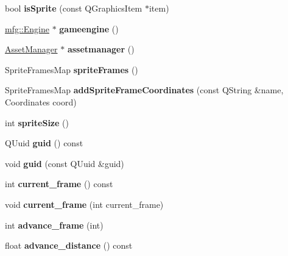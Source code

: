 \begin{DoxyCompactItemize}
bool {\bfseries is\+Sprite} (const Q\+Graphics\+Item $\ast$item)
\item 
\mbox{\label{class_sprite_a289c85c632dfcafe8cc378c649d8375c}} 
\hyperlink{classmfg_1_1_engine}{mfg\+::\+Engine} $\ast$ {\bfseries gameengine} ()
\item 
\mbox{\label{class_sprite_abe1915f40313eaca777665dc041440ab}} 
\hyperlink{class_asset_manager}{Asset\+Manager} $\ast$ {\bfseries assetmanager} ()
\item 
\mbox{\label{class_sprite_ad690815ac85d948a52a1136596037c67}} 
Sprite\+Frames\+Map {\bfseries sprite\+Frames} ()
\item 
\mbox{\label{class_sprite_a2c6faefb1b08c2a87d6b0562f3577e6f}} 
Sprite\+Frames\+Map {\bfseries add\+Sprite\+Frame\+Coordinates} (const Q\+String \&name, Coordinates coord)
\item 
\mbox{\label{class_sprite_a6dccaa6d6fca24fc01a7a48542bc3fa2}} 
int {\bfseries sprite\+Size} ()
\item 
\mbox{\label{class_sprite_a2891012b8636c18d38b244bc54d31c03}} 
Q\+Uuid {\bfseries guid} () const
\item 
\mbox{\label{class_sprite_a55b47ce9303d5b2ac9b4a2e48f8baacc}} 
void {\bfseries guid} (const Q\+Uuid \&guid)
\item 
\mbox{\label{class_sprite_a3fb65e4969ae7c92278513e187d4d2db}} 
int {\bfseries current\+\_\+frame} () const
\item 
\mbox{\label{class_sprite_acad9e57881565704cce66f6a9f25b553}} 
void {\bfseries current\+\_\+frame} (int current\+\_\+frame)
\item 
\mbox{\label{class_sprite_aa5e9083132f0431a76e64eaad2c37d0b}} 
int {\bfseries advance\+\_\+frame} (int)
\item 
\mbox{\label{class_sprite_af1e07744e99034cbcaea64d0cb6d7de3}} 
float {\bfseries advance\+\_\+distance} () const
\item 

\end{DoxyCompactItemize}
